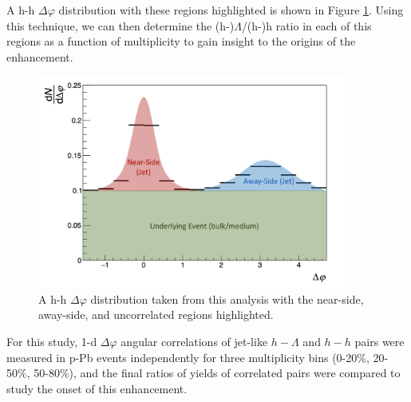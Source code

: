 A h-h $\Delta\varphi$ distribution with these regions highlighted is shown in Figure \ref{fig:dphi_regions}. Using this technique, we can then determine the (h-)$\Lambda$/(h-)h ratio in each of this regions as a function of multiplicity to gain insight to the origins of the enhancement.

\begin{figure}
\centering
\includegraphics[width=4in]{figures/analysis/dphi_regions.png}
\caption{A h-h $\Delta\varphi$ distribution taken from this analysis with the near-side, away-side, and uncorrelated regions highlighted.}
\label{fig:dphi_regions}
\end{figure}

For this study, 1-d $\Delta\varphi$ angular correlations of jet-like $h-\Lambda$ and $h-h$ pairs were measured in p-Pb events independently for three multiplicity bins (0-20\%, 20-50\%, 50-80\%), and the final ratios of yields of correlated pairs were compared to study the onset of this enhancement. 